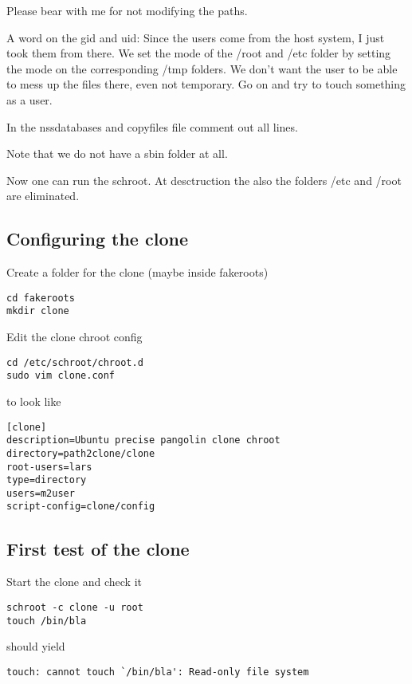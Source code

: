 \documentclass[a4paper]{book}
\begin{document}
Please bear with me for not modifying the paths.

A word on the gid and uid: Since the users come from the host system, I just
took them from there.  We set the mode of the /root and /etc folder by setting
the mode on the corresponding /tmp folders.  We don't want the user to be able
to mess up the files there, even not temporary. Go on and try to touch
something as a user.

In the nssdatabases and copyfiles file comment out all lines.

Note that we do not have a sbin folder at all.

Now one can run the schroot. At desctruction the also the folders /etc and
/root are eliminated.

\subsection{Configuring the clone}

Create a folder for the clone (maybe inside fakeroots)

\begin{verbatim}
cd fakeroots
mkdir clone
\end{verbatim}

Edit the clone chroot config

\begin{verbatim}
cd /etc/schroot/chroot.d
sudo vim clone.conf
\end{verbatim}

to look like

\begin{verbatim}
[clone]
description=Ubuntu precise pangolin clone chroot
directory=path2clone/clone
root-users=lars
type=directory
users=m2user
script-config=clone/config
\end{verbatim}

\subsection{First test of the clone}

Start the clone and check it

\begin{verbatim}
schroot -c clone -u root
touch /bin/bla
\end{verbatim}

should yield

\begin{verbatim}
touch: cannot touch `/bin/bla': Read-only file system
\end{verbatim}
\end{document}
